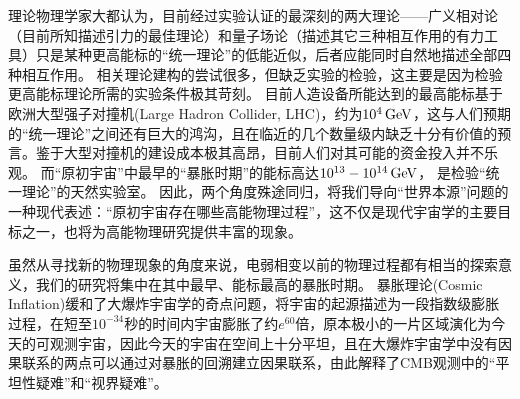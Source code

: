 理论物理学家大都认为，目前经过实验认证的最深刻的两大理论——广义相对论（目前所知描述引力的最佳理论）和量子场论（描述其它三种相互作用的有力工具）只是某种更高能标的“统一理论”的低能近似，后者应能同时自然地描述全部四种相互作用。
相关理论建构的尝试很多，但缺乏实验的检验，这主要是因为检验更高能标理论所需的实验条件极其苛刻。
目前人造设备所能达到的最高能标基于欧洲大型强子对撞机(Large Hadron Collider, LHC)，约为$10^4\,{\rm GeV}$，这与人们预期的“统一理论”之间还有巨大的鸿沟，且在临近的几个数量级内缺乏十分有价值的预言。鉴于大型对撞机的建设成本极其高昂，目前人们对其可能的资金投入并不乐观。
而“原初宇宙”中最早的“暴胀时期”的能标高达$10^{13}-10^{14}\,{\rm GeV}$，%
是检验“统一理论”的天然实验室。
因此，两个角度殊途同归，将我们导向“世界本源”问题的一种现代表述：“原初宇宙存在哪些高能物理过程”，这不仅是现代宇宙学的主要目标之一，也将为高能物理研究提供丰富的现象。


虽然从寻找新的物理现象的角度来说，电弱相变以前的物理过程都有相当的探索意义，我们的研究将集中在其中最早、能标最高的暴胀时期。
暴胀理论(Cosmic Inflation)\cite{guth1981inflation}缓和了大爆炸宇宙学的奇点问题，将宇宙的起源描述为一段指数级膨胀过程，在短至$10^{-34}$秒的时间内宇宙膨胀了约$e^{60}$倍，原本极小的一片区域演化为今天的可观测宇宙，因此今天的宇宙在空间上十分平坦，且在大爆炸宇宙学中没有因果联系的两点可以通过对暴胀的回溯建立因果联系，由此解释了CMB观测中的“平坦性疑难”和“视界疑难”。

